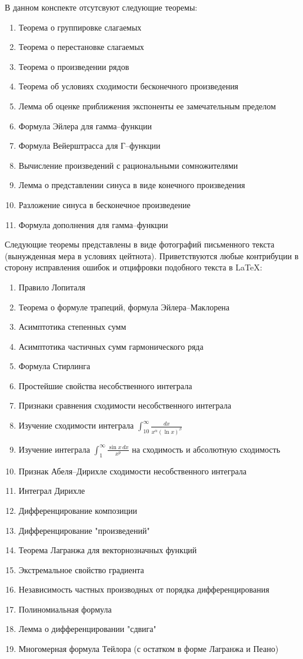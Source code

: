 \documentclass{article}
\begin{document}
В данном конспекте отсутсвуют следующие теоремы:
\begin{enumerate}
\item Теорема о группировке слагаемых
\item Теорема о перестановке слагаемых
\item Теорема о произведении рядов
\item Теорема об условиях сходимости бесконечного произведения
\item Лемма об оценке приближения экспоненты ее замечательным пределом
\item Формула Эйлера для гамма--функции
\item Формула Вейерштрасса для Г--функции
\item Вычисление произведений с рациональными сомножителями
\item Лемма о представлении синуса в виде конечного произведения
\item Разложение синуса в бесконечное произведение
\item Формула дополнения для гамма--функции
\end{enumerate}

Следующие теоремы представлены в виде фотографий письменного текста (вынужденная мера в условиях цейтнота). Приветствуются любые контрибуции в сторону исправления ошибок и отцифровки подобного текста в LaTeX:
\begin{enumerate}
    \item Правило Лопиталя
    \item Теорема о формуле трапеций, формула Эйлера--Маклорена
    \item Асимптотика степенных сумм
    \item Асимптотика частичных сумм гармонического ряда
    \item Формула Стирлинга
    \item Простейшие свойства несобственного интеграла
    \item Признаки сравнения сходимости несобственного интеграла
    \item Изучение сходимости интеграла $\int_{10}^\infty \frac{dx}{x^\alpha (\ln x)^\beta}$
    \item Изучение интеграла $\int_1^{\infty} \frac{\sin x\,dx}{x^p}$ на сходимость и абсолютную сходимость
    \item Признак Абеля--Дирихле сходимости несобственного интеграла
    \item Интеграл Дирихле
    \item Дифференцирование композиции
    \item Дифференцирование "произведений"
    \item Теорема Лагранжа для векторнозначных функций
    \item Экстремальное свойство градиента
    \item Независимость частных производных от порядка дифференцирования
    \item Полиномиальная формула
    \item Лемма о дифференцировании "сдвига"
    \item Многомерная формула Тейлора (с остатком в форме Лагранжа и Пеано)
\end{enumerate}
\end{document}
